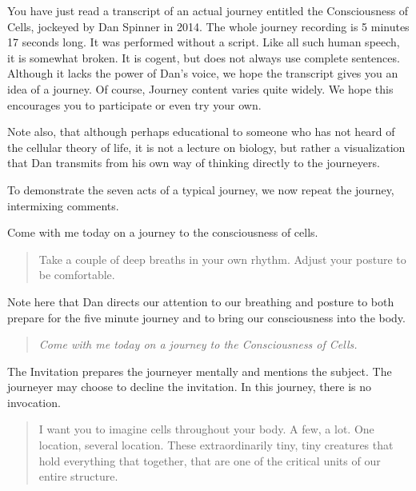 \documentclass[12pt]{book}
\begin{document}
\hrulefill

You have just read a transcript of an actual journey entitled the
Consciousness of Cells, jockeyed by Dan Spinner in 2014. The whole
journey recording is 5 minutes 17 seconds long. It was performed
without a script. Like all such human speech, it is somewhat
broken. It is cogent, but does not always use complete
sentences. Although it lacks the power of Dan's voice, we hope the
transcript gives you an idea of a journey. Of course, Journey content varies
quite widely. We hope this encourages you to participate or even try
your own.
					
Note also, that although perhaps educational to someone who has not
heard of the cellular theory of life, it is not a lecture on biology,
but rather a visualization that Dan transmits from his own way of
thinking directly to the journeyers.
					
To demonstrate the seven acts of a typical journey, we now repeat the
journey, intermixing comments.

\hrulefill
					
					
					
Come with me today on a journey to the consciousness of cells.


\begin{quote}{\em

    Take a couple of deep breaths in your own rhythm.  Adjust your
    posture to be comfortable.  }
\end{quote}

Note here that Dan directs our attention to our breathing and posture
to both prepare for the five minute journey and to bring our
consciousness into the body.

\begin{quote}{\em
    Come with me today on a journey to the Consciousness of Cells.
}\end{quote}

The Invitation prepares the journeyer mentally and mentions the
subject. The journeyer may choose to decline the invitation.  In this
journey, there is no invocation.

\begin{quote}{\em

I want you to imagine cells throughout your body. A few, a lot. One
location, several location. These extraordinarily tiny, tiny creatures
that hold everything that together, that are one of the critical units
of our entire structure.

}\end{quote}
\end{document}
